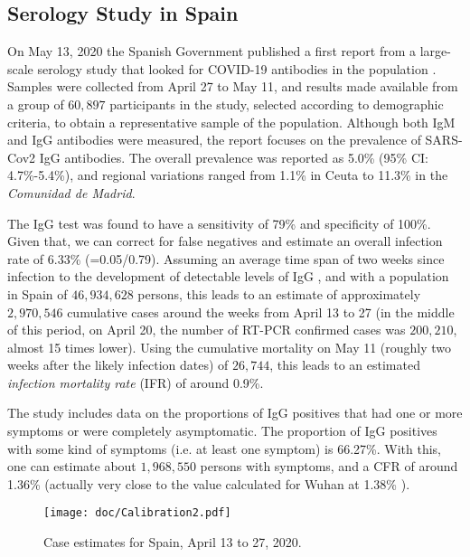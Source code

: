 \documentclass[sigconf,authordraft]{acmart}
\begin{document}
\subsection{Serology Study in Spain}

On May 13, 2020 the Spanish Government published a first report from a large-scale serology study that looked for COVID-19 antibodies in the population \cite{ENEcovid19}. Samples were collected from April 27 to May 11, and results made available from a group of $60,897$ participants in the study, selected according to demographic criteria, to obtain a representative sample of the population. Although both IgM and IgG antibodies were measured, the report focuses on the prevalence of  SARS-Cov2 IgG antibodies. The overall prevalence was reported as 5.0\% (95\% CI: 4.7\%-5.4\%), and regional variations ranged from 1.1\% in Ceuta to 11.3\% in the \emph{Comunidad de Madrid}.

The IgG test was found to have a sensitivity of 79\% and specificity of 100\%. Given that, we can correct for false negatives and estimate an overall infection rate of 6.33\% (=0.05/0.79). Assuming an average time span of two weeks since infection to the development of detectable levels of IgG \cite{long2020antibody}, and with a population in Spain of $46,934,628$ persons, this leads to an estimate of approximately $2,970,546$ cumulative cases around the weeks from April 13 to 27 (in the middle of this period, on April 20, the number of RT-PCR confirmed cases was $200,210$, almost 15 times lower). Using the cumulative mortality on May 11 (roughly two weeks after the likely infection dates) of $26,744$, this leads to an estimated \emph{infection mortality rate} (IFR) of around 0.9\%. 

The study includes data on the proportions of IgG positives that had one or more symptoms or were completely asymptomatic. The proportion of IgG positives with some kind of symptoms (i.e. at least one symptom) is 66.27\%. With this, one can estimate about $1,968,550$ persons with symptoms, and a CFR of around 1.36\% (actually very close to the value calculated for Wuhan at 1.38\% \cite{Verity2020}).


\begin{figure}[htb]
\begin{center}
\texttt{[image: doc/Calibration2.pdf]}
\end{center}
\caption{Case estimates for Spain, April 13 to 27, 2020.}
\label{cal}
\end{figure}
\end{document}
